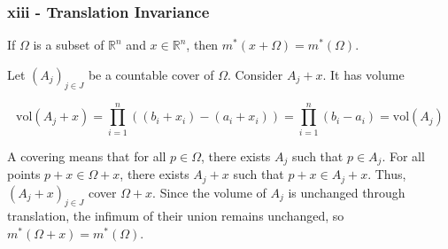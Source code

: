 \documentclass{article}
\newcommand{\R}{\mathbb{R}}
\newcommand{\vol}{\text{vol}}
\begin{document}
\subsubsection*{xiii - Translation Invariance}

If $\Omega$ is a subset of $\R^n$ and $x \in \R^n$, then $m^*(x + \Omega) = m^*(\Omega)$.

Let $(A_j)_{j \in J}$ be a countable cover of $\Omega$. Consider $A_j + x$. It has volume

\[
\vol(A_j + x) = \prod_{i=1}^n ((b_i + x_i) - (a_i + x_i)) = \prod_{i=1}^n (b_i - a_i) = \vol(A_j)
\]

A covering means that for all $p \in \Omega$, there exists $A_j$ such that $p \in A_j$. For all points $p+x \in \Omega + x$, there exists $A_j + x$ such that $p+x \in A_j + x$. Thus, $(A_j + x)_{j \in J}$ cover $\Omega + x$. Since the volume of $A_j$ is unchanged through translation, the infimum of their union remains unchanged, so $m^*(\Omega+x) = m^*(\Omega)$.
\end{document}
